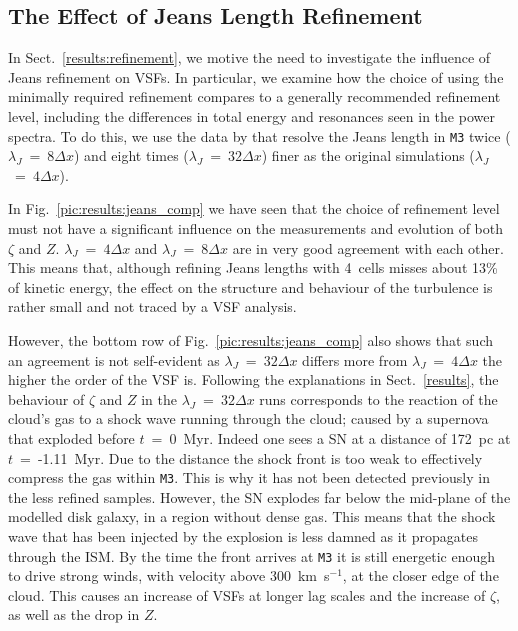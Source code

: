 

\subsection{The Effect of Jeans Length Refinement}\label{discussion:refinement}

In Sect.~\ref{results:refinement}, we motive the need to investigate the influence of Jeans refinement on VSFs.
In particular, we examine how the choice of using the minimally required refinement compares to a generally recommended refinement level, including the differences in total energy and resonances seen in the power spectra. 
To do this, we use the data by  that resolve the Jeans length in \texttt{M3} twice ($\lambda_J$~=~$8\Delta{}x$) and eight times ($\lambda_J$~=~$32\Delta{}x$) finer as the original simulations ($\lambda_J$~=~$4\Delta{}x$).

In Fig.~\ref{pic:results:jeans_comp} we have seen that the choice of refinement level must not have a significant influence on the measurements and evolution of both $\zeta$ and $Z$. 
$\lambda_J$~=~$4\Delta{}x$ and $\lambda_J$~=~$8\Delta{}x$ are in very good agreement with each other.
This means that, although refining Jeans lengths with 4~cells misses about 13\% of kinetic energy, the effect on the structure and behaviour of the turbulence is rather small and not traced by a VSF analysis.

However, the bottom row of Fig.~\ref{pic:results:jeans_comp} also shows that such an agreement is not self-evident as $\lambda_J$~=~$32\Delta{}x$ differs more from $\lambda_J$~=~$4\Delta{}x$ the higher the order of the VSF is.
Following the explanations in Sect.~\ref{results}, the behaviour of $\zeta$ and $Z$ in the $\lambda_J$~=~$32\Delta{}x$ runs corresponds to the reaction of the cloud's gas to a shock wave running through the cloud; caused by a supernova that exploded before $t$~=~0~Myr. 
Indeed one sees a SN at a distance of 172~pc at $t$~=~-1.11~Myr. 
Due to the distance the shock front is too weak to effectively compress the gas within \texttt{M3}.
This is why it has not been detected previously in the less refined samples.
However, the SN explodes far below the mid-plane of the modelled disk galaxy, in a region without dense gas.
This means that the shock wave that has been injected by the explosion is less damned as it propagates through the ISM. 
By the time the front arrives at \texttt{M3} it is still energetic enough to drive strong winds, with velocity above 300~km~s$^{-1}$, at the closer edge of the cloud. 
This causes an increase of VSFs at longer lag scales and the increase of $\zeta$, as well as the drop in $Z$.

